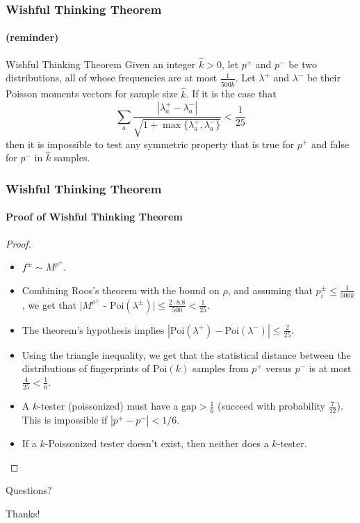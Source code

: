 \documentclass{beamer}
\begin{document}
\begin{frame}
  \frametitle{Wishful Thinking Theorem} \framesubtitle{(reminder)}

  \begin{block}{Wishful Thinking Theorem}
    Given an integer $\hat{k}>0$, let $p^+$ and $p^-$ be two distributions,
    all of whose frequencies are at most $\frac{1}{500\hat{k}}$. Let
    $\lambda^+$ and $\lambda^-$ be their Poisson moments vectors for sample
    size $\hat{k}$. If it is the case that
    \begin{equation*}
      \sum_a\frac{|\lambda^+_a-\lambda^-_a|}{\sqrt{1+\max\{\lambda^+_a,\lambda^-_a\}}}<\frac{1}{25}
    \end{equation*}
    then it is impossible to test any symmetric property that is true
    for $p^+$ and false for $p^-$ in $\hat{k}$ samples.
  \end{block}

\end{frame}


\begin{frame}
  \frametitle{Wishful Thinking Theorem} \framesubtitle{Proof of
    Wishful Thinking Theorem}  
    
    \begin{proof}
    \begin{itemize}
    \item<1-> $f^\pm\sim M^{\rho^\pm}$.
    \item<2-> Combining Roos's theorem with the bound on $\rho$, and
      assuming that $p_i^\pm\le\frac{1}{500k}$, we get that $|M^{\rho^\pm}$ -
      $\mbox{Poi}(\lambda^\pm)|\le \frac{2\cdot 8.8}{500}<\frac{1}{25}$.
    \item<3-> The theorem's hypothesis implies
      $|\mbox{Poi}(\lambda^+)-\mbox{Poi}(\lambda^-)|\le\frac{2}{25}$.
    \item<4-> Using the triangle inequality, we get that the
      statistical distance between the distributions of fingerprints
      of $\mbox{Poi}(k)$ samples from $p^+$ versus $p^-$ is at most
      $\frac{4}{25}<\frac{1}{6}$.
    \item<5-> A $k$-tester (poissonized) must have a gap$>\frac{1}{6}$
      (succeed with probability $\frac{7}{12}$). This is impossible if
      $|p^+-p^-|<1/6$.
    \item<6-> If a $k$-Poissonized tester doesn't exist, then neither
      does a $k$-tester.
    \end{itemize}
    \end{proof}
\end{frame}

\begin{frame}
  Questions?
\end{frame}

\begin{frame}
  Thanks!
\end{frame}
\end{document}
